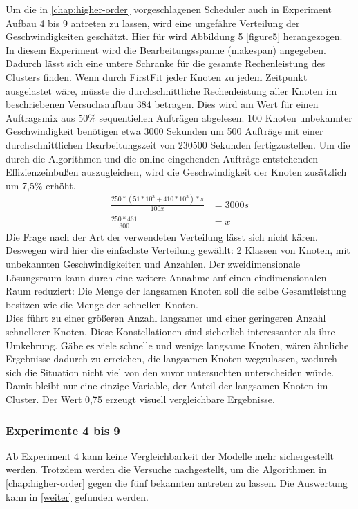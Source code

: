 Um die in \ref{chap:higher-order} vorgeschlagenen Scheduler auch in Experiment Aufbau 4 bis 9 antreten zu lassen, wird eine ungefähre Verteilung der Geschwindigkeiten geschätzt.
Hier für wird Abbildung 5 \ref{figure5} herangezogen. In diesem Experiment wird die Bearbeitungsspanne (makespan) angegeben. Dadurch lässt sich eine untere Schranke für die gesamte Rechenleistung des Clusters finden. Wenn durch FirstFit jeder Knoten zu jedem Zeitpunkt ausgelastet wäre, müsste die durchschnittliche Rechenleistung aller Knoten im beschriebenen Versuchsaufbau 384 betragen. Dies wird am Wert für einen Auftragsmix aus 50\% sequentiellen Aufträgen abgelesen. 100 Knoten unbekannter Geschwindigkeit benötigen etwa 3000 Sekunden um 500 Aufträge mit einer durchschnittlichen Bearbeitungszeit von 230500 Sekunden fertigzustellen. Um die durch die Algorithmen und die online eingehenden Aufträge entstehenden Effizienzeinbußen auszugleichen, wird die Geschwindigkeit der Knoten zusätzlich um 7,5\% erhöht.
\begin{align*}
\frac{250*(51* 10^3 + 410*10^3)*s}{100x} &= 3000s \\
\frac{250*461}{300} &= x
\end{align*}
Die Frage nach der Art der verwendeten Verteilung lässt sich nicht kären. Deswegen wird hier die einfachste Verteilung gewählt: 2 Klassen von Knoten, mit unbekannten Geschwindigkeiten und Anzahlen. Der zweidimensionale Lösungsraum kann durch eine weitere Annahme auf einen eindimensionalen Raum reduziert: Die Menge der langsamen Knoten soll die selbe Gesamtleistung besitzen wie die Menge der schnellen Knoten.\\
Dies führt zu einer größeren Anzahl langsamer und einer geringeren Anzahl schnellerer Knoten. Diese Konstellationen sind sicherlich interessanter als ihre Umkehrung. Gäbe es viele schnelle und wenige langsame Knoten, wären ähnliche Ergebnisse dadurch zu erreichen, die langsamen Knoten wegzulassen, wodurch sich die Situation nicht viel von den zuvor untersuchten unterscheiden würde.\\
Damit bleibt nur eine einzige Variable, der Anteil der langsamen Knoten im Cluster. Der Wert 0,75 erzeugt visuell vergleichbare Ergebnisse.

\FloatBarrier

\subsubsection{Experimente 4 bis 9}
Ab Experiment 4 kann keine Vergleichbarkeit der Modelle mehr sichergestellt werden. Trotzdem werden die Versuche nachgestellt, um die Algorithmen in \ref{chap:higher-order} gegen die fünf bekannten antreten zu lassen. Die Auswertung kann in \ref{weiter} gefunden werden.


